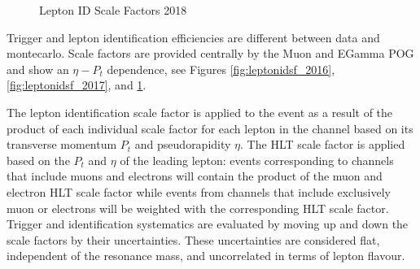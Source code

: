 \begin{figure}[tph]
  \caption{Lepton ID Scale Factors 2018}
  \label{fig:leptonidsf_2018}
\end{figure}

Trigger and lepton identification efficiencies are different between data
and montecarlo. Scale factors are provided centrally by the Muon and EGamma POG
and show an $\eta-P_{t}$ dependence, see Figures \ref{fig:leptonidsf_2016},
\ref{fig:leptonidsf_2017}, and \ref{fig:leptonidsf_2018}.

The lepton identification scale factor is applied to the event
as a result of the product of each individual scale factor for each lepton in
the channel based on its transverse momentum $P_{t}$ and pseudorapidity $\eta$.
The HLT scale factor is applied based on the $P_{t}$ and $\eta$ of the leading
lepton: events corresponding to channels that include muons and electrons
will contain the product of the muon and electron HLT scale factor while events
from channels that include exclusively muon or electrons will be weighted with
the corresponding HLT scale factor.
Trigger and identification systematics are evaluated by moving up
and down the scale factors by their uncertainties. These uncertainties
are considered flat, independent of the resonance mass, and uncorrelated
in terms of lepton flavour.

